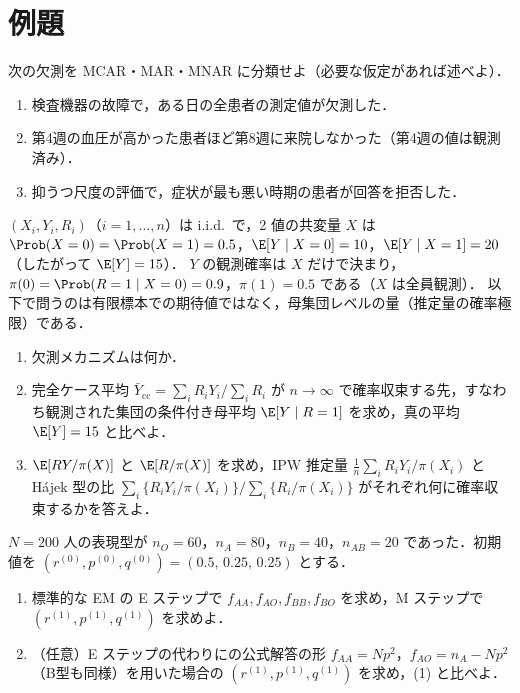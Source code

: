 \section{例題}\label{sec:16-ex}
\begin{reidai}[欠測メカニズムの分類]\label{reidai:16-1}
次の欠測を MCAR・MAR・MNAR に分類せよ（必要な仮定があれば述べよ）．
\begin{enumerate}[label=(\arabic*)]
\item 検査機器の故障で，ある日の全患者の測定値が欠測した．
\item 第4週の血圧が高かった患者ほど第8週に来院しなかった（第4週の値は観測済み）．
\item 抑うつ尺度の評価で，症状が最も悪い時期の患者が回答を拒否した．
\end{enumerate}
\end{reidai}

\begin{reidai}[完全ケース解析の偏り]\label{reidai:16-2}
$(X_i,Y_i,R_i)$（$i=1,\dots,n$）は i.i.d.\ で，2 値の共変量 $X$ は $\Prob(X=0)=\Prob(X=1)=0.5$，$\E[Y\mid X=0]=10$，$\E[Y\mid X=1]=20$（したがって $\E[Y]=15$）．
$Y$ の観測確率は $X$ だけで決まり，$\pi(0)=\Prob(R=1\mid X=0)=0.9$，$\pi(1)=0.5$ である（$X$ は全員観測）．
以下で問うのは有限標本での期待値ではなく，母集団レベルの量（推定量の確率極限）である．
\begin{enumerate}[label=(\arabic*)]
\item 欠測メカニズムは何か．
\item 完全ケース平均 $\bar Y_{\mathrm{cc}}=\sum_iR_iY_i/\sum_iR_i$ が $n\to\infty$ で確率収束する先，すなわち観測された集団の条件付き母平均 $\E[Y\mid R=1]$ を求め，真の平均 $\E[Y]=15$ と比べよ．
\item $\E[RY/\pi(X)]$ と $\E[R/\pi(X)]$ を求め，IPW 推定量 $\frac1n\sum_iR_iY_i/\pi(X_i)$ と Hájek 型の比 $\sum_i\{R_iY_i/\pi(X_i)\}/\sum_i\{R_i/\pi(X_i)\}$ がそれぞれ何に確率収束するかを答えよ．
\end{enumerate}
\end{reidai}

\begin{reidai}\label{reidai:16-3}
$N=200$ 人の表現型が $n_O=60$，$n_A=80$，$n_B=40$，$n_{AB}=20$ であった．初期値を $(r^{(0)},p^{(0)},q^{(0)})=(0.5,\,0.25,\,0.25)$ とする．
\begin{enumerate}[label=(\arabic*)]
\item 標準的な EM の E ステップで $f_{AA},f_{AO},f_{BB},f_{BO}$ を求め，M ステップで $(r^{(1)},p^{(1)},q^{(1)})$ を求めよ．
\item （任意）E ステップの代わりにの公式解答の形 $f_{AA}=Np^2$，$f_{AO}=n_A-Np^2$（B型も同様）を用いた場合の $(r^{(1)},p^{(1)},q^{(1)})$ を求め，(1) と比べよ．
\end{enumerate}
\end{reidai}

